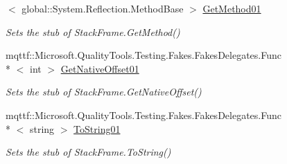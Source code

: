 \begin{DoxyCompactItemize}
$<$ global\-::\-System.\-Reflection.\-Method\-Base $>$ \hyperlink{class_system_1_1_diagnostics_1_1_fakes_1_1_stub_stack_frame_a33646ada16935c8df3ceccd08ccc02ae}{Get\-Method01}
\begin{DoxyCompactList}\small\item\em Sets the stub of Stack\-Frame.\-Get\-Method()\end{DoxyCompactList}\item 
mqttf\-::\-Microsoft.\-Quality\-Tools.\-Testing.\-Fakes.\-Fakes\-Delegates.\-Func\\*
$<$ int $>$ \hyperlink{class_system_1_1_diagnostics_1_1_fakes_1_1_stub_stack_frame_a20a93177020a6feff97403d69508a505}{Get\-Native\-Offset01}
\begin{DoxyCompactList}\small\item\em Sets the stub of Stack\-Frame.\-Get\-Native\-Offset()\end{DoxyCompactList}\item 
mqttf\-::\-Microsoft.\-Quality\-Tools.\-Testing.\-Fakes.\-Fakes\-Delegates.\-Func\\*
$<$ string $>$ \hyperlink{class_system_1_1_diagnostics_1_1_fakes_1_1_stub_stack_frame_ab36fc75b47dd428a484b4f570ccad993}{To\-String01}
\begin{DoxyCompactList}\small\item\em Sets the stub of Stack\-Frame.\-To\-String()\end{DoxyCompactList}\end{DoxyCompactItemize}
